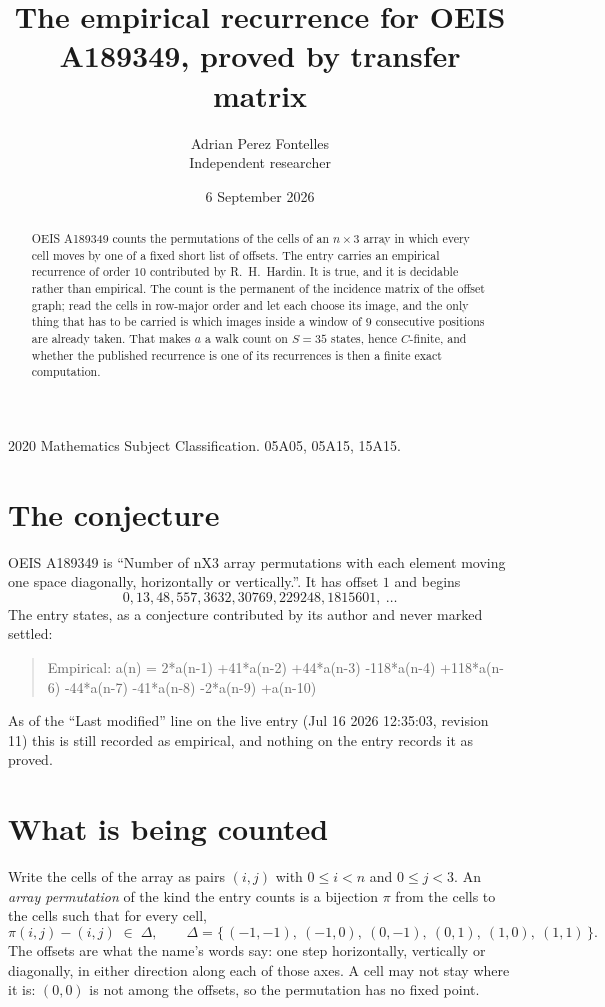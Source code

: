 \documentclass[11pt,a4paper]{article}
\title{The empirical recurrence for OEIS A189349, proved by transfer matrix}
\author{Adrian Perez Fontelles\\ \small Independent researcher}
\date{6 September 2026}
\theoremstyle{plain}
\theoremstyle{definition}
\begin{document}
\maketitle

\begin{abstract}
OEIS A189349 counts the permutations of the cells of an $n\times3$ array in which every cell
moves by one of a fixed short list of offsets. The entry carries an empirical recurrence of
order $10$ contributed by R.~H.~Hardin. It is true, and it is decidable rather than
empirical. The count is the permanent of the incidence matrix of the offset graph; read the
cells in row-major order and let each choose its image, and the only thing that has to be
carried is which images inside a window of $9$ consecutive positions are already taken.
That makes $a$ a walk count on $S=35$ states, hence $C$-finite, and whether the published
recurrence is one of its recurrences is then a finite exact computation.
\end{abstract}

\noindent\small 2020 Mathematics Subject Classification. 05A05, 05A15, 15A15.\normalsize

\section{The conjecture}

OEIS A189349 is ``Number of nX3 array permutations with each element moving one space diagonally, horizontally or vertically.''. It has offset $1$ and begins
\[
0, 13, 48, 557, 3632, 30769, 229248, 1815601,\ \dots
\]
The entry states, as a conjecture contributed by its author and never marked settled:
\begin{quote}
Empirical: a(n) = 2*a(n-1) +41*a(n-2) +44*a(n-3) -118*a(n-4) +118*a(n-6) -44*a(n-7) -41*a(n-8) -2*a(n-9) +a(n-10)
\end{quote}
As of the ``Last modified'' line on the live entry (Jul 16 2026 12:35:03, revision 11) this is still
recorded as empirical, and nothing on the entry records it as proved.

\section{What is being counted}

Write the cells of the array as pairs $(i,j)$ with $0\le i<n$ and $0\le j<3$. An
\emph{array permutation} of the kind the entry counts is a bijection $\pi$ from the cells to
the cells such that for every cell,
\[
\pi(i,j)-(i,j)\;\in\;\Delta,\qquad
\Delta=\{\,(-1,-1),\ (-1,0),\ (0,-1),\ (0,1),\ (1,0),\ (1,1)\,\}.
\]
The offsets are what the name's words say: one step horizontally, vertically or diagonally, in either direction along each of those axes. A cell may not stay where it is: $(0,0)$ is not among the offsets, so the permutation has no fixed point.
\end{document}
